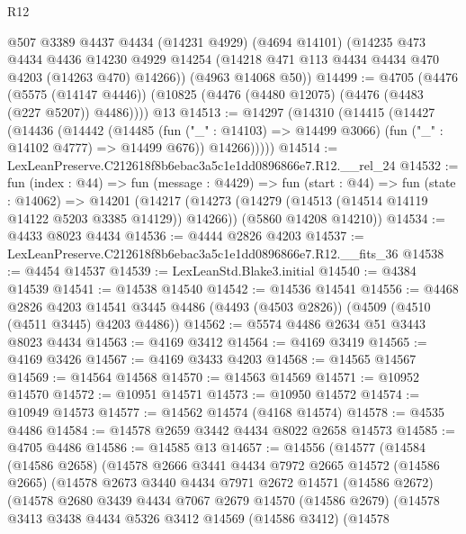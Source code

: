 \begin{lexlean}{R12}
\begin{coremodule}
      @507
      @3389
      @4437
      @4434
      (@14231 @4929)
      (@4694 @14101)
      (@14235
        @473
        @4434
        @4436
        @14230
        @4929
        @14254
        (@14218 @471 @113 @4434 @4434 @470 @4203 (@14263 @470) @14266))
      (@4963 @14068 @50))
@14499 := @4705
    (@4476
      (@5575 (@14147 @4446))
      (@10825 (@4476 (@4480 @12075) (@4476 (@4483 (@227 @5207)) @4486))))
    @13
@14513 := @14297
    (@14310
      (@14415
        (@14427
          (@14436
            (@14442
              (@14485
                (fun ("_" : @14103) => @14499 @3066)
                (fun ("_" : @14102 @4777) => @14499 @676))
              @14266)))))
@14514 := LexLeanPreserve.C212618f8b6ebac3a5c1e1dd0896866e7.R12.__rel_24
@14532 := fun (index : @44) =>
  fun (message : @4429) =>
  fun (start : @44) =>
  fun (state : @14062) =>
  @14201
    (@14217
      (@14273 (@14279 (@14513 (@14514 @14119 @14122 @5203 @3385 @14129)) @14266))
      (@5860 @14208 @14210))
@14534 := @4433 @8023 @4434
@14536 := @4444 @2826 @4203
@14537 := LexLeanPreserve.C212618f8b6ebac3a5c1e1dd0896866e7.R12.__fits_36
@14538 := @4454 @14537
@14539 := LexLeanStd.Blake3.initial
@14540 := @4384 @14539
@14541 := @14538 @14540
@14542 := @14536 @14541
@14556 := @4468
    @2826
    @4203
    @14541
    @3445
    @4486
    (@4493 (@4503 @2826))
    (@4509 (@4510 (@4511 @3445) @4203 @4486))
@14562 := @5574 @4486 @2634 @51 @3443 @8023 @4434
@14563 := @4169 @3412
@14564 := @4169 @3419
@14565 := @4169 @3426
@14567 := @4169 @3433 @4203
@14568 := @14565 @14567
@14569 := @14564 @14568
@14570 := @14563 @14569
@14571 := @10952 @14570
@14572 := @10951 @14571
@14573 := @10950 @14572
@14574 := @10949 @14573
@14577 := @14562 @14574 (@4168 @14574)
@14578 := @4535 @4486
@14584 := @14578 @2659 @3442 @4434 @8022 @2658 @14573
@14585 := @4705 @4486
@14586 := @14585 @13
@14657 := @14556
    (@14577
      (@14584
        (@14586 @2658)
        (@14578
          @2666
          @3441
          @4434
          @7972
          @2665
          @14572
          (@14586 @2665)
          (@14578
            @2673
            @3440
            @4434
            @7971
            @2672
            @14571
            (@14586 @2672)
            (@14578
              @2680
              @3439
              @4434
              @7067
              @2679
              @14570
              (@14586 @2679)
              (@14578
                @3413
                @3438
                @4434
                @5326
                @3412
                @14569
                (@14586 @3412)
                (@14578

\end{coremodule}
\end{lexlean}

